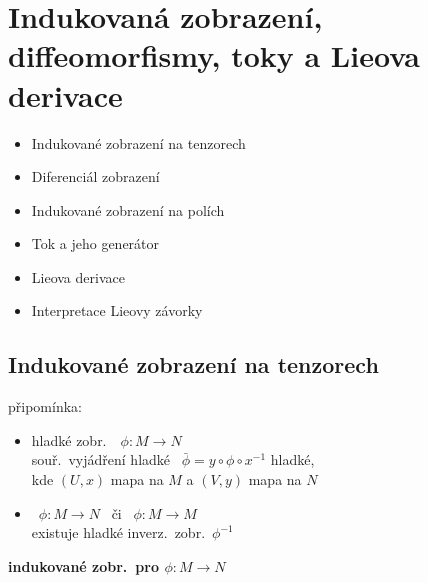 
\section{Indukovaná zobrazení, diffeomorfismy, toky a Lieova derivace}

\begin{itemize}[nosep]
  \item Indukované zobrazení na tenzorech
  \item Diferenciál zobrazení
  \item Indukované zobrazení na polích
  \item Tok a jeho generátor
  \item Lieova derivace
  \item Interpretace Lieovy závorky
\end{itemize}

\subsection{Indukované zobrazení na tenzorech}

připomínka:
\begin{itemize}[nosep]
  \item[] hladké zobr.\ \ $\phi: M\to N$ \\
          \quad souř.\ vyjádření hladké \ $\bar\phi = y\circ\phi\circ x^{-1}$ hladké, \\
          \quad kde $(U,x)$ mapa na $M$ a $(V,y)$ mapa na $N$
  \item[]  \ $\phi: M\to N$ \ či \ $\phi: M\to M$ \\
          \quad existuje hladké inverz.\ zobr.\ $\phi^{-1}$
\end{itemize}

\textbf{indukované zobr.\ pro $\phi: M\to N$}

